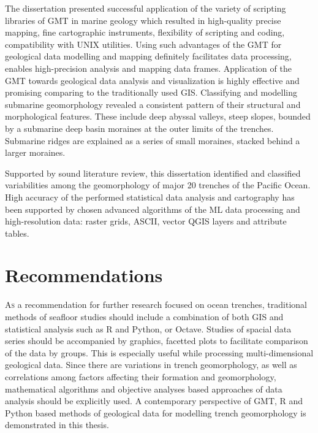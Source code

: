 \documentclass[11pt,a4paper]{report}
\begin{document}
{The dissertation presented successful application of the variety of scripting libraries of \ac{GMT} in marine geology which resulted in high-quality precise mapping, fine cartographic instruments, flexibility of scripting and coding, compatibility with UNIX utilities. Using such advantages of the \ac{GMT} for geological data modelling and mapping definitely facilitates data processing, enables high-precision analysis and mapping data frames. Application of the \ac{GMT} towards geological data analysis and visualization is highly effective and promising comparing to the traditionally used \ac{GIS}. Classifying and modelling submarine geomorphology revealed a consistent pattern of their structural and morphological features. These include deep abyssal valleys, steep slopes, bounded by a submarine deep basin moraines at the outer limits of the trenches. Submarine ridges are explained as a series of small moraines, stacked behind a larger moraines.

Supported by sound literature review, this dissertation identified and classified variabilities among the geomorphology of major 20 trenches of the Pacific Ocean. High accuracy of the performed statistical data analysis and cartography has been supported by chosen advanced algorithms of the \ac{ML} data processing and high-resolution data: raster grids, \ac{ASCII}, vector \ac{QGIS} layers and attribute tables. 
\pagebreak
\section{Recommendations}\label{sec:9}
\lettrine[lines=3]{\color{Red4}A}{s} a recommendation for further research focused on ocean trenches, traditional methods of seafloor studies should include a combination of both \ac{GIS} and statistical analysis such as R and Python, or Octave. Studies of spacial data series should be accompanied by graphics, facetted plots to facilitate comparison of the data by groups. This is especially useful while processing multi-dimensional geological data. Since there are variations in trench geomorphology, as well as correlations among factors affecting their formation and geomorphology, mathematical algorithms and objective analyses based approaches of data analysis should be explicitly used. A contemporary perspective of \ac{GMT}, R and Python based methods of geological data for modelling trench geomorphology is demonstrated in this thesis. 

}
\end{document}
